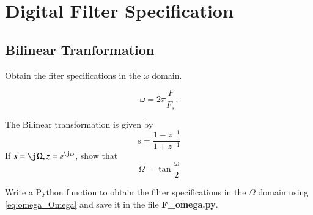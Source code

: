 \documentclass[journal,12pt,twocolumn]{IEEEtran}
\begin{document}
\section{Digital Filter Specification}
\subsection{Bilinear Tranformation}
\begin{problem}
Obtain the fiter specifications in the $\omega$ domain.
\end{problem}
\solution
\begin{equation}
\omega = 2\pi \frac{F}{F_s}.
\end{equation}

\begin{problem}
The Bilinear transformation is given by
%
\begin{equation}
s = \frac{1-z^{-1}}{1+z^{-1}}
\end{equation}
%
If $s = \j \Omega, z = e^{\j \omega}$, show that
\begin{equation}
\label{eq:omega_Omega}
\Omega = \tan \frac{\omega}{2}
\end{equation}
\end{problem}
%
%
%
%
\begin{problem}
Write a Python function to obtain the filter specifications in the $\Omega$ domain using \eqref{eq:omega_Omega} and save it in the file  \textbf{F\_omega.py}.
\end{problem}
\solution 

%
\end{document}
